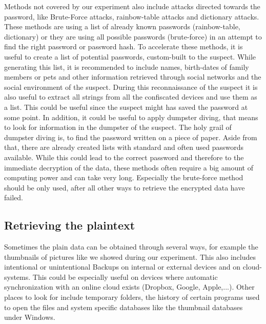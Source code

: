 Methods not covered by our experiment also include attacks directed towards the password, like Brute-Force attacks, rainbow-table attacks and dictionary attacks. These methods are using a list of already known passwords (rainbow-table, dictionary) or they are using all possible passwords (brute-force) in an attempt to find the right password or password hash.
To accelerate these methods, it is useful to create a list of potential passwords, custom-built to the suspect. While generating this list, it is recommended to include names, birth-dates of family members or pets and other information retrieved through social networks and the social environment of the suspect. During this reconnaissance of the suspect it is also useful to extract all strings from all the confiscated devices and use them as a list. This could be useful since the suspect might has saved the password at some point. In addition, it could be useful to apply dumpster diving, that means to look for information in the dumpster of the suspect. 
The holy grail of dumpster diving is, to find the password written on a piece of paper. 
Aside from that, there are already created lists with standard and often used passwords available.
While this could lead to the correct password and therefore to the immediate decryption of the data, these methods often require a big amount of
computing power and can take very long.
Especially the brute-force method should be only used, after all other ways to retrieve the encrypted data have failed.

\subsection{Retrieving the plaintext}
Sometimes the plain data can be obtained through several ways, for example the thumbnails of pictures like we showed during our experiment. This also includes intentional or unintentional Backups on internal or external devices and on cloud-systems.
This could be especially useful on devices where automatic synchronization with an online cloud exists (Dropbox, Google, Apple,...). Other places to look for include temporary folders, the history of certain programs used to open the files and system specific databases like the thumbnail databases under Windows.
